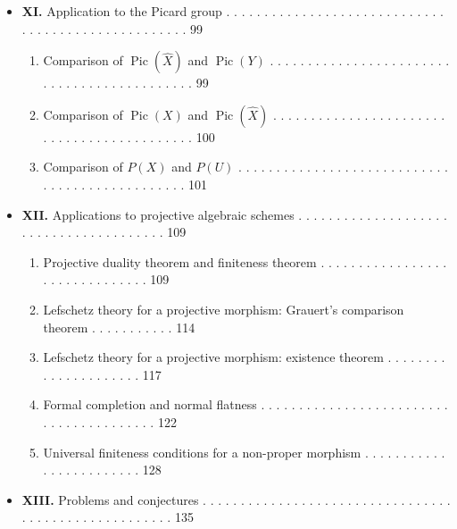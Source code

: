 \documentclass[
]{article}
\providecommand{\tightlist}{%
  \setlength{\itemsep}{0pt}\setlength{\parskip}{0pt}}
\begin{document}
\begin{itemize}
  \begin{enumerate}
  \def\labelenumi{\arabic{enumi}.}
  \tightlist
  \item
    Comparison of \(\hat{E}t(\hat{X})\) and \(\hat{E}t(Y)\) . . . . . .
    . . . . . . . . . . . . . . . . . . . . . . . . . . . . . . . . . .
    . . . . . . 89
  \item
    Comparison of \(\hat{E}t(Y)\) and \(\hat{E}t(U)\), for \(U\)
    variable . . . . . . . . . . . . . . . . . . . . . . . . . . . . . .
    . . . 89
  \item
    Comparison of \(\pi_{1}(X)\) and \(\pi_{1}(U)\) . . . . . . . . . .
    . . . . . . . . . . . . . . . . . . . . . . . . . . . . . . . . . .
    . . 94
  \end{enumerate}
\item
  \textbf{XI.} Application to the Picard group . . . . . . . . . . . . .
  . . . . . . . . . . . . . . . . . . . . . . . . . . . . . . . . . . .
  . . . 99

  \begin{enumerate}
  \def\labelenumi{\arabic{enumi}.}
  \tightlist
  \item
    Comparison of \(\operatorname{Pic}(\hat{X})\) and
    \(\operatorname{Pic}(Y)\) . . . . . . . . . . . . . . . . . . . . .
    . . . . . . . . . . . . . . . . . . . . . . . 99
  \item
    Comparison of \(\operatorname{Pic}(X)\) and
    \(\operatorname{Pic}(\hat{X})\) . . . . . . . . . . . . . . . . . .
    . . . . . . . . . . . . . . . . . . . . . . . . . 100
  \item
    Comparison of \(P(X)\) and \(P(U)\) . . . . . . . . . . . . . . . .
    . . . . . . . . . . . . . . . . . . . . . . . . . . . . . . . 101
  \end{enumerate}
\item
  \textbf{XII.} Applications to projective algebraic schemes . . . . . .
  . . . . . . . . . . . . . . . . . . . . . . . . . . . . . . . . . 109

  \begin{enumerate}
  \def\labelenumi{\arabic{enumi}.}
  \tightlist
  \item
    Projective duality theorem and finiteness theorem . . . . . . . . .
    . . . . . . . . . . . . . . . . . . . . . . 109
  \item
    Lefschetz theory for a projective morphism: Grauert's comparison
    theorem . . . . . . . . . . . 114
  \item
    Lefschetz theory for a projective morphism: existence theorem . . .
    . . . . . . . . . . . . . . . . . . 117
  \item
    Formal completion and normal flatness . . . . . . . . . . . . . . .
    . . . . . . . . . . . . . . . . . . . . . . . . . 122
  \item
    Universal finiteness conditions for a non-proper morphism . . . . .
    . . . . . . . . . . . . . . . . . . . 128
  \end{enumerate}
\item
  \textbf{XIII.} Problems and conjectures . . . . . . . . . . . . . . .
  . . . . . . . . . . . . . . . . . . . . . . . . . . . . . . . . . . .
  . . . 135


\end{itemize}
\end{document}
